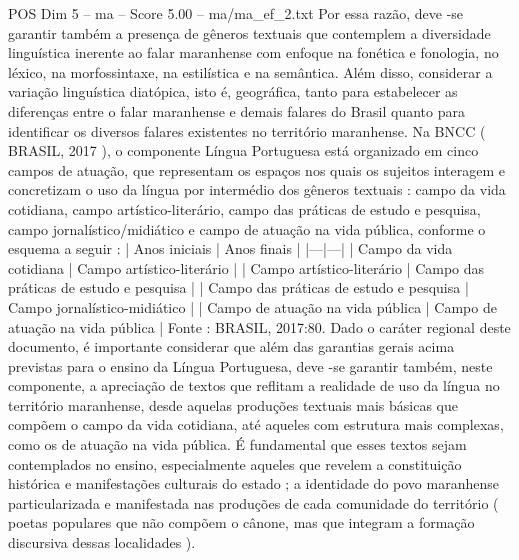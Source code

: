 \begin{textsample}{POS Dim 5 – ma – Score 5.00 – ma/ma\_ef\_2.txt}
Por essa razão, deve -se garantir também a presença de gêneros textuais que contemplem a diversidade linguística inerente ao falar maranhense com enfoque na fonética e fonologia, no léxico, na morfossintaxe, na estilística e na semântica.
Além disso, considerar a variação linguística diatópica, isto é, geográfica, tanto para estabelecer as diferenças entre o falar maranhense e demais falares do Brasil quanto para identificar os diversos falares existentes no território maranhense.
Na BNCC ( BRASIL, 2017 ), o componente Língua Portuguesa está organizado em cinco campos de atuação, que representam os espaços nos quais os sujeitos interagem e concretizam o uso da língua por intermédio dos gêneros textuais : campo da vida cotidiana, campo artístico-literário, campo das práticas de estudo e pesquisa, campo jornalístico/midiático e campo de atuação na vida pública, conforme o esquema a seguir : | Anos iniciais | Anos finais | |---|---| | Campo da vida cotidiana | Campo artístico-literário | | Campo artístico-literário | Campo das práticas de estudo e pesquisa | | Campo das práticas de estudo e pesquisa | Campo jornalístico-midiático | | Campo de atuação na vida pública | Campo de atuação na vida pública | Fonte : BRASIL, 2017:80.
Dado o caráter regional deste documento, é importante considerar que além das garantias gerais acima previstas para o ensino da Língua Portuguesa, deve -se garantir também, neste componente, a apreciação de textos que reflitam a realidade de uso da língua no território maranhense, desde aquelas produções textuais mais básicas que compõem o campo da vida cotidiana, até aqueles com estrutura mais complexas, como os de atuação na vida pública.
É fundamental que esses textos sejam contemplados no ensino, especialmente aqueles que revelem a constituição histórica e manifestações culturais do estado ; a identidade do povo maranhense particularizada e manifestada nas produções de cada comunidade do território ( poetas populares que não compõem o cânone, mas que integram a formação discursiva dessas localidades ).

\end{textsample}
